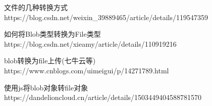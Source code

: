 文件的几种转换方式
https://blog.csdn.net/weixin_39889465/article/details/119547359

如何将Blob类型转换为File类型
https://blog.csdn.net/xieamy/article/details/110919216

blob转换为file上传(七牛云等)
https://www.cnblogs.com/uimeigui/p/14271789.html

使用js将blob对象转file对象
https://dandelioncloud.cn/article/details/1503449404588781570
